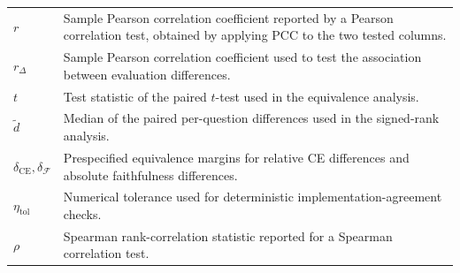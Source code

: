 \begin{longtable}{@{}>{\raggedright\arraybackslash}p{} p{}@{}}
	$r$                                                & Sample Pearson correlation coefficient reported by a Pearson correlation test, obtained by applying $\mathrm{PCC}$ to the two tested columns.                                                                      \\
	$r_{\Delta}$                                       & Sample Pearson correlation coefficient used to test the association between evaluation differences.                                                                                                                \\
	$t$                                                & Test statistic of the paired $t$-test used in the equivalence analysis.                                                                                                                                            \\
	$\widetilde{d}$                                    & Median of the paired per-question differences used in the signed-rank analysis.                                                                                                                                    \\
	$\delta_{\mathrm{CE}},\delta_{\mathcal{F}}$        & Prespecified equivalence margins for relative CE differences and absolute faithfulness differences.                                                                                                                \\
	$\eta_{\mathrm{tol}}$                              & Numerical tolerance used for deterministic implementation-agreement checks.                                                                                                                                        \\
	$\rho$                                             & Spearman rank-correlation statistic reported for a Spearman correlation test.                                                                                                                                      \\
\end{longtable}
